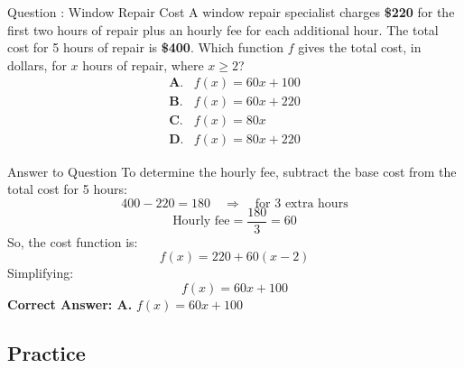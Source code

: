\documentclass{beamer}
\begin{document}
\begin{frame}{Question : Window Repair Cost}
    A window repair specialist charges \textbf{\$220} for the first two hours of repair plus an hourly fee for each additional hour. The total cost for 5 hours of repair is \textbf{\$400}. Which function \( f \) gives the total cost, in dollars, for \( x \) hours of repair, where \( x \geq 2 \)?
    \[
    \begin{array}{ll}
    \textbf{A.} & f(x) = 60x + 100 \\
    \textbf{B.} & f(x) = 60x + 220 \\
    \textbf{C.} & f(x) = 80x \\
    \textbf{D.} & f(x) = 80x + 220
    \end{array}
    \]
\end{frame}


\begin{frame}{Answer to Question }
    To determine the hourly fee, subtract the base cost from the total cost for 5 hours:
    \[
    400 - 220 = 180 \quad \Rightarrow \quad \text{for 3 extra hours}
    \]
    \[
    \text{Hourly fee} = \frac{180}{3} = 60
    \]
    So, the cost function is:
    \[
    f(x) = 220 + 60(x - 2)
    \]
    Simplifying:
    \[
    f(x) = 60x + 100
    \]
    \textbf{Correct Answer: A.} \( f(x) = 60x + 100 \)
\end{frame}


\begin{frame}
\section{Practice}
\end{frame}
\end{document}
